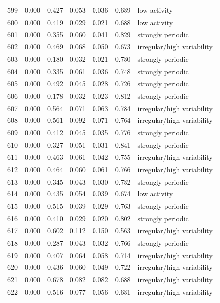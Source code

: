 \begin{longtable}{lrrrrrl}
599 & 0.000 & 0.427 & 0.053 & 0.036 & 0.689 & low activity \\
600 & 0.000 & 0.419 & 0.029 & 0.021 & 0.688 & low activity \\
601 & 0.000 & 0.355 & 0.060 & 0.041 & 0.829 & strongly periodic \\
602 & 0.000 & 0.469 & 0.068 & 0.050 & 0.673 & irregular/high variability \\
603 & 0.000 & 0.180 & 0.032 & 0.021 & 0.780 & strongly periodic \\
604 & 0.000 & 0.335 & 0.061 & 0.036 & 0.748 & strongly periodic \\
605 & 0.000 & 0.492 & 0.045 & 0.028 & 0.726 & strongly periodic \\
606 & 0.000 & 0.178 & 0.032 & 0.023 & 0.812 & strongly periodic \\
607 & 0.000 & 0.564 & 0.071 & 0.063 & 0.784 & irregular/high variability \\
608 & 0.000 & 0.561 & 0.092 & 0.071 & 0.764 & irregular/high variability \\
609 & 0.000 & 0.412 & 0.045 & 0.035 & 0.776 & strongly periodic \\
610 & 0.000 & 0.327 & 0.051 & 0.031 & 0.841 & strongly periodic \\
611 & 0.000 & 0.463 & 0.061 & 0.042 & 0.755 & irregular/high variability \\
612 & 0.000 & 0.464 & 0.060 & 0.061 & 0.766 & irregular/high variability \\
613 & 0.000 & 0.345 & 0.043 & 0.030 & 0.782 & strongly periodic \\
614 & 0.000 & 0.435 & 0.054 & 0.039 & 0.674 & low activity \\
615 & 0.000 & 0.515 & 0.039 & 0.029 & 0.763 & strongly periodic \\
616 & 0.000 & 0.410 & 0.029 & 0.020 & 0.802 & strongly periodic \\
617 & 0.000 & 0.602 & 0.112 & 0.150 & 0.563 & irregular/high variability \\
618 & 0.000 & 0.287 & 0.043 & 0.032 & 0.766 & strongly periodic \\
619 & 0.000 & 0.407 & 0.064 & 0.058 & 0.714 & irregular/high variability \\
620 & 0.000 & 0.436 & 0.060 & 0.049 & 0.722 & irregular/high variability \\
621 & 0.000 & 0.678 & 0.082 & 0.082 & 0.688 & irregular/high variability \\
622 & 0.000 & 0.516 & 0.077 & 0.056 & 0.681 & irregular/high variability \\

\end{longtable}
